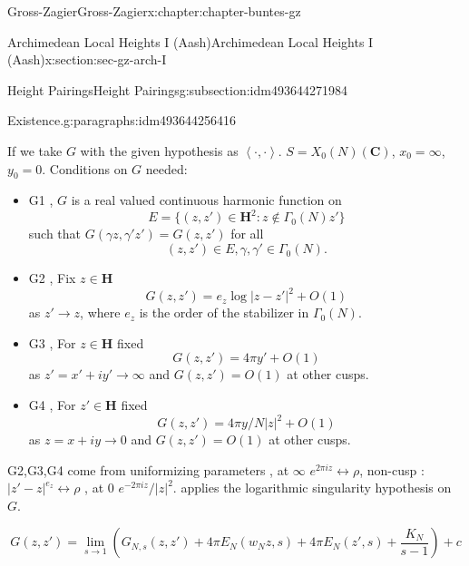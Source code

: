 \documentclass[oneside,10pt,]{book}
\numberwithin{equation}{section}
\newcommand{\pair}[2]{\left\langle #1, #2 \right\rangle}
\newcommand{\CC}{\mathbf{C}}
\newcommand{\HH}{\mathbf{H}}
\begin{document}
\begin{chapterptx}{Gross-Zagier}{}{Gross-Zagier}{}{}{x:chapter:chapter-buntes-gz}
\begin{sectionptx}{Archimedean Local Heights I (Aash)}{}{Archimedean Local Heights I (Aash)}{}{}{x:section:sec-gz-arch-I}
\begin{subsectionptx}{Height Pairings}{}{Height Pairings}{}{}{g:subsection:idm493644271984}
\begin{paragraphs}{Existence.}{g:paragraphs:idm493644256416}
\begin{equation*}
\end{equation*}
%
\par
If we take \(G\) with the given hypothesis as \(\pair\cdot\cdot\). \(S  = X_0(N)(\CC)\), \(x_0 = \infty \), \(y_0 = 0\). Conditions on \(G\) needed:%
\begin{itemize}[label=\textbullet]
\item{}G1 , \(G\) is a real valued continuous harmonic function on%
\begin{equation*}
E = \{ (z,z') \in \HH^2 : z\not \in \Gamma _0(N) z'\}
\end{equation*}
such that \(G(\gamma  z, \gamma 'z') = G(z,z')\) for all%
\begin{equation*}
(z,z')\in E, \gamma ,\gamma '\in \Gamma _0(N)\text{.}
\end{equation*}
%
\item{}G2 , Fix \(z\in \HH\)%
\begin{equation*}
G(z,z') = e_z\log|z- z'|^2 + O(1)
\end{equation*}
as \(z'\to z\), where \(e_z\) is the order of the stabilizer in \(\Gamma _0(N)\).%
\item{}G3 , For \(z\in \HH\) fixed%
\begin{equation*}
G(z,z') = 4\pi  y' + O(1)
\end{equation*}
as \(z' = x' + iy' \to \infty \) and \(G(z,z') = O(1)\) at other cusps.%
\item{}G4 , For \(z'\in \HH\) fixed%
\begin{equation*}
G(z,z') = 4\pi  y/N|z|^2 + O(1)
\end{equation*}
as \(z = x + iy \to 0 \) and \(G(z,z') = O(1)\) at other cusps.%
\end{itemize}
%
\par
G2,G3,G4 come from uniformizing parameters , at \(\infty \) \(e^{2\pi i z} \leftrightarrow \rho \), non-cusp : \(|z' -z|^{e_z} \leftrightarrow \rho \) , at 0 \(e^{-2\pi i z}/|z|^2\). applies the logarithmic singularity hypothesis on \(G\).%
\par
%
\begin{equation*}
G(z,z') = \lim_{s\to 1} \left( G_{N,s} (z,z') + 4 \pi  E_N(w_N z, s) + 4 \pi  E_N(z', s) + \frac{K_N}{s-1}\right) + c
\end{equation*}
%
\end{paragraphs}%
\end{subsectionptx}
\end{sectionptx}
%
%
\typeout{************************************************}

\end{chapterptx}
\end{document}
